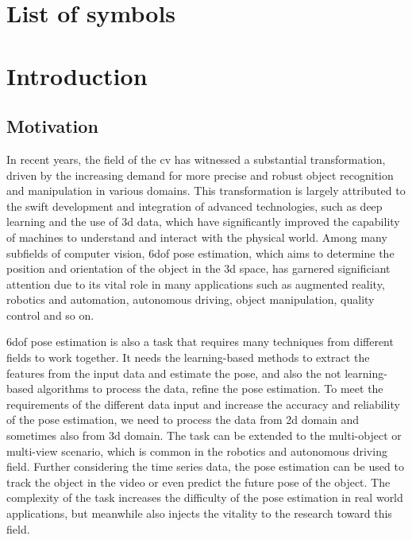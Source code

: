\documentclass[12pt,DIV14,BCOR12mm,a4paper,footinclude=false,headinclude,parskip=half-,twoside,openright,cleardoublepage=empty,toc=index,bibliography=totoc,listof=totoc]{scrreprt}
\title{\maintitle}%
\subtitle{\translatedtitle}
\author{
\large
  \ifthenelse{\equal{\doclang}{german}}{
  \begin{tabular}{rp{7cm}}
    \Large 
    Autor:      & \Large \student \vspace*{2mm}\\
    Ausgabe:    & \startdate \\
    Abgabe:     & \submission \vspace*{3mm}\\
    Betreuer:   & \tutor \vspace*{2mm}\\
    Stichworte: & \keywords
  \end{tabular}
  }{
  \begin{tabular}{rp{7cm}}
    \Large 
    Author:             & \Large \student \vspace*{2mm}\\
    Date of work begin: & \startdate \\
    Date of submission: & \submission \vspace*{3mm}\\
    Supervisor:         & \tutor \vspace*{2mm}\\
    Keywords:           & \keywords
  \end{tabular}
  }
  \bugfix
}
\date{}
\numberwithin{equation}{chapter}
\begin{document}
\maketitle
\cleardoublepage
{} %
\tableofcontents
\cleardoublepage
\setcounter{page}{1}

\chapter*{List of symbols}



\setlength\LTleft{-5pt}
\printglossary[type=\acronymtype,title=List of Acronyms,nonumberlist,style=custom_acronyms]


\chapter{Introduction}
\section{Motivation}
In recent years, the field of the \gls{cv} has witnessed a substantial transformation, driven by the increasing demand for more precise and robust object recognition and manipulation in various domains. This transformation is largely attributed to the swift development and integration of advanced technologies, such as deep learning and the use of \gls{3d} data, which have significantly improved the capability of machines to understand and interact with the physical world. Among many subfields of computer vision, \gls{6dof} pose estimation, which aims to determine the position and orientation of the object in the \gls{3d} space, has garnered significiant attention due to its vital role in many applications such as augmented reality, robotics and automation, autonomous driving, object manipulation, quality control and so on.

\gls{6dof} pose estimation is also a task that requires many techniques from different fields to work together. It needs the learning-based methods to extract the features from the input data and estimate the pose, and also the not learning-based algorithms to process the data, refine the pose estimation. To meet the requirements of the different data input and increase the accuracy and reliability of the pose estimation, we need to process the data from \gls{2d} domain and sometimes also from \gls{3d} domain. The task can be extended to the multi-object or multi-view scenario, which is common in the robotics and autonomous driving field. Further considering the time series data, the pose estimation can be used to track the object in the video or even predict the future pose of the object. The complexity of the task increases the difficulty of the pose estimation in real world applications, but meanwhile also injects the vitality to the research toward this field.
\end{document}
